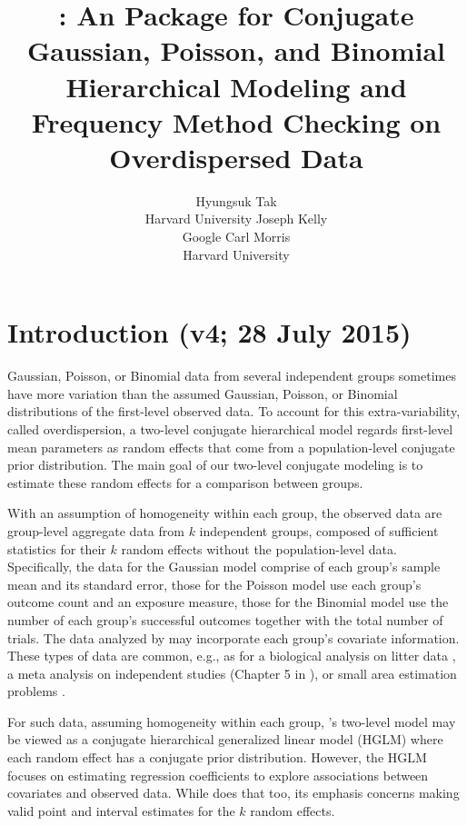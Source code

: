 \documentclass[article]{jss}
\author{Hyungsuk Tak\\Harvard University \And 
             Joseph Kelly\\Google\And
             Carl Morris\\ Harvard University}
\title{\pkg{Rgbp}: An \proglang{R} Package for Conjugate Gaussian, Poisson, and Binomial Hierarchical Modeling and Frequency Method Checking on Overdispersed Data}
\begin{document}

\section[Introduction]{Introduction (v4; 28 July 2015)}
Gaussian, Poisson, or Binomial data from several independent groups sometimes have more variation than the assumed Gaussian, Poisson, or Binomial distributions of the first-level observed data. To account for this extra-variability, called overdispersion, a  two-level conjugate hierarchical model regards first-level mean parameters as random effects that come from a population-level conjugate prior distribution. The main  goal of our two-level conjugate modeling is to estimate these random effects for a comparison between groups.



With an assumption of homogeneity within each group, the observed data are group-level aggregate data from $k$ independent  groups, composed of sufficient statistics for their $k$ random effects without the population-level data. Specifically, the data for the Gaussian model comprise of each group's sample mean and its standard error, those for the Poisson model use each group's outcome count and an exposure measure, those for the Binomial model use the number of each group's  successful outcomes together with the total number of trials. The data analyzed by  may incorporate each group's covariate information. These types of  data are common, e.g., as for a biological analysis on litter data \citep{tamura1987stabilized}, a meta analysis on independent studies (Chapter 5 in \cite{gelman2014bayesian}), or small area estimation problems \citep{ghosh1994small, rao2003small}.  

For such data, assuming homogeneity within each group, 's two-level model may be viewed as a conjugate hierarchical generalized linear model (HGLM) \citep{lee1996hierarchical, hglm2006} where each random effect has a conjugate prior distribution.    However, the HGLM focuses on estimating regression coefficients to explore associations between covariates and observed data.   While  does that too, its emphasis concerns making valid point and interval estimates for the $k$ random effects.
\end{document}
